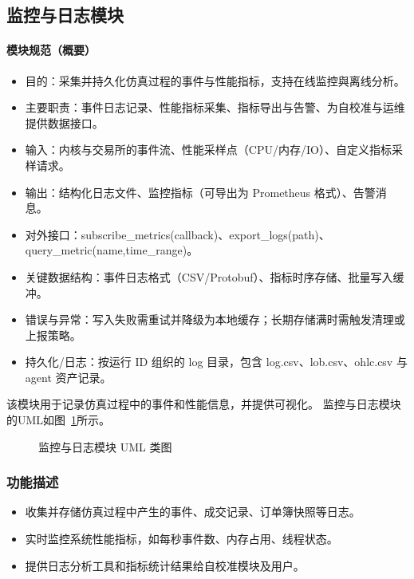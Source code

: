 \subsection{监控与日志模块}

\paragraph{模块规范（概要）}
\begin{itemize}
  \item 目的：采集并持久化仿真过程的事件与性能指标，支持在线监控與离线分析。
  \item 主要职责：事件日志记录、性能指标采集、指标导出与告警、为自校准与运维提供数据接口。
  \item 输入：内核与交易所的事件流、性能采样点（CPU/内存/IO）、自定义指标采样请求。
  \item 输出：结构化日志文件、监控指标（可导出为 Prometheus 格式）、告警消息。
  \item 对外接口：subscribe\_metrics(callback)、export\_logs(path)、query\_metric(name,time\_range)。
  \item 关键数据结构：事件日志格式（CSV/Protobuf）、指标时序存储、批量写入缓冲。
  \item 错误与异常：写入失败需重试并降级为本地缓存；长期存储满时需触发清理或上报策略。
  \item 持久化/日志：按运行 ID 组织的 log 目录，包含 log.csv、lob.csv、ohlc.csv 与 agent 资产记录。
\end{itemize}

该模块用于记录仿真过程中的事件和性能信息，并提供可视化。
监控与日志模块的UML如图~\ref{fig:uml_monitoring}所示。

\begin{figure}[H]
  \centering
  \resizebox{0.8\linewidth}{!}{}
  \caption{监控与日志模块 UML 类图}
  \label{fig:uml_monitoring}
\end{figure}

\subsubsection{功能描述}
\begin{itemize}
  \item 收集并存储仿真过程中产生的事件、成交记录、订单簿快照等日志。
  \item 实时监控系统性能指标，如每秒事件数、内存占用、线程状态。
  \item 提供日志分析工具和指标统计结果给自校准模块及用户。
\end{itemize}

